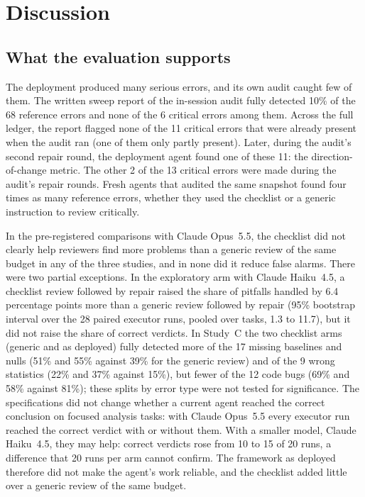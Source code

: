 \section*{Discussion}

\subsection*{What the evaluation supports}
The deployment produced many serious errors, and its own audit caught few
of them. The written sweep report of the in-session audit fully detected
10\% of the 68 reference errors and none of the 6 critical errors among
them. Across the full ledger, the report flagged none of the 11 critical
errors that were already present when the audit ran (one of them only
partly present). Later, during the audit's second repair round, the
deployment agent found one of these 11: the direction-of-change metric.
The other 2 of the 13 critical errors were made during the
audit's repair rounds. Fresh agents that audited the same snapshot found four times as
many reference errors, whether they used the checklist or a generic
instruction to review critically.

In the pre-registered comparisons with Claude Opus~5.5, the checklist did
not clearly help reviewers find more problems than a generic review of
the same budget in any of the three studies, and in none did it reduce
false alarms. There were two partial exceptions. In the exploratory arm
with Claude Haiku~4.5, a checklist review followed by repair raised the
share of pitfalls handled by 6.4 percentage points more than a generic
review followed by repair (95\% bootstrap interval over the 28 paired
executor runs, pooled over tasks, 1.3 to 11.7), but it did not raise the
share of correct verdicts. In Study~C the two checklist arms (generic and
as deployed) fully detected more of the 17 missing baselines and nulls
(51\% and 55\% against 39\% for the generic review) and of the 9 wrong
statistics (22\% and 37\% against 15\%), but fewer of the 12 code bugs
(69\% and 58\% against 81\%); these splits by error type were not tested
for significance. The specifications did not change whether a current
agent reached the correct conclusion on focused analysis tasks: with
Claude Opus~5.5 every executor run reached the correct verdict with or
without them. With a smaller model, Claude Haiku~4.5, they may help:
correct verdicts rose from 10 to 15 of 20 runs, a difference that 20 runs
per arm cannot confirm. The framework as deployed therefore did not make
the agent's work reliable, and the checklist added little over a generic
review of the same budget.

